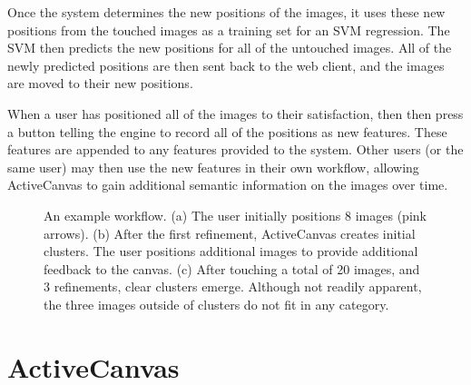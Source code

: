 \documentclass[journal]{vgtc}
\begin{document}
{Once the system determines the new positions of the images, it uses these new positions from the touched images as a training set for an SVM regression.  The SVM then predicts the new positions for all of the untouched images.  All of the newly predicted positions are then sent back to the web client, and the images are moved to their new positions. 

When a user has positioned all of the images to their satisfaction, then then press a button telling the engine to record all of the  positions as new features. These features are appended to any features provided to the system. Other users (or the same user) may then use the new features in their own workflow, allowing ActiveCanvas to gain additional semantic information on the images over time.
}

\begin{figure}[h]
\centering
\begin{subfigure}[Initial Arrangement\label{fig:step1}]{\texttt{[image: Figs/moved\_images.pdf]}}
\end{subfigure}
\begin{subfigure}[First Refinement\label{fig:step2}]{\texttt{[image: Figs/round1.pdf]}}
\end{subfigure}
\begin{subfigure}[Final Refinement, 20 images touched\label{fig:finalstep}]{\texttt{[image: Figs/final\_arrangment\_20touched.pdf]}}
\end{subfigure}
\caption{An example workflow.  (a) The user initially positions 8 images (pink arrows). (b) After the first refinement, ActiveCanvas creates initial clusters. The user positions additional images to provide additional feedback to the canvas. (c) After touching a total of 20 images, and 3  refinements, clear clusters emerge. Although not readily apparent, the three images outside of clusters do not fit in any category.}\label{fig:workflow}
\end{figure}

\section{ActiveCanvas}\label{sec:discussion}
\end{document}

